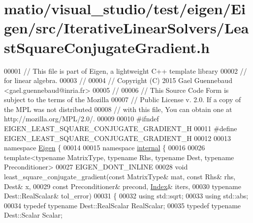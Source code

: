 \hypertarget{matio_2visual__studio_2test_2eigen_2_eigen_2src_2_iterative_linear_solvers_2_least_square_conjugate_gradient_8h_source}{}\section{matio/visual\+\_\+studio/test/eigen/\+Eigen/src/\+Iterative\+Linear\+Solvers/\+Least\+Square\+Conjugate\+Gradient.h}
\label{matio_2visual__studio_2test_2eigen_2_eigen_2src_2_iterative_linear_solvers_2_least_square_conjugate_gradient_8h_source}

\begin{DoxyCode}
00001 \textcolor{comment}{// This file is part of Eigen, a lightweight C++ template library}
00002 \textcolor{comment}{// for linear algebra.}
00003 \textcolor{comment}{//}
00004 \textcolor{comment}{// Copyright (C) 2015 Gael Guennebaud <gael.guennebaud@inria.fr>}
00005 \textcolor{comment}{//}
00006 \textcolor{comment}{// This Source Code Form is subject to the terms of the Mozilla}
00007 \textcolor{comment}{// Public License v. 2.0. If a copy of the MPL was not distributed}
00008 \textcolor{comment}{// with this file, You can obtain one at http://mozilla.org/MPL/2.0/.}
00009 
00010 \textcolor{preprocessor}{#ifndef EIGEN\_LEAST\_SQUARE\_CONJUGATE\_GRADIENT\_H}
00011 \textcolor{preprocessor}{#define EIGEN\_LEAST\_SQUARE\_CONJUGATE\_GRADIENT\_H}
00012 
00013 \textcolor{keyword}{namespace }\hyperlink{namespace_eigen}{Eigen} \{ 
00014 
00015 \textcolor{keyword}{namespace }\hyperlink{namespaceinternal}{internal} \{
00016 
00026 \textcolor{keyword}{template}<\textcolor{keyword}{typename} MatrixType, \textcolor{keyword}{typename} Rhs, \textcolor{keyword}{typename} Dest, \textcolor{keyword}{typename} Preconditioner>
00027 EIGEN\_DONT\_INLINE
00028 \textcolor{keywordtype}{void} least\_square\_conjugate\_gradient(\textcolor{keyword}{const} MatrixType& mat, \textcolor{keyword}{const} Rhs& rhs, Dest& x,
00029                                      \textcolor{keyword}{const} Preconditioner& precond, \hyperlink{namespace_eigen_a62e77e0933482dafde8fe197d9a2cfde}{Index}& iters,
00030                                      \textcolor{keyword}{typename} Dest::RealScalar& tol\_error)
00031 \{
00032   \textcolor{keyword}{using} std::sqrt;
00033   \textcolor{keyword}{using} std::abs;
00034   \textcolor{keyword}{typedef} \textcolor{keyword}{typename} Dest::RealScalar RealScalar;
00035   \textcolor{keyword}{typedef} \textcolor{keyword}{typename} Dest::Scalar Scalar;

\end{DoxyCode}
